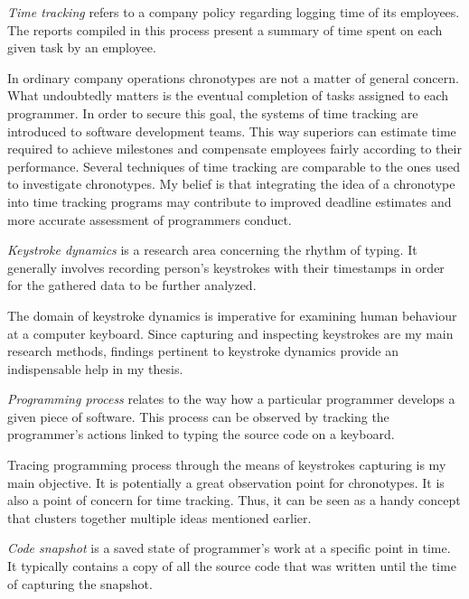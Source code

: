 \begin{definition}
\emph{Time tracking} refers to a company policy regarding logging time of its employees. The reports compiled in this process present a summary of time spent on each given task by an employee. \cite{Fed21TimeTracking}
\end{definition}

In ordinary company operations chronotypes are not a matter of general concern. What undoubtedly matters is the eventual completion of tasks assigned to each programmer. In order to secure this goal, the systems of time tracking are introduced to software development teams. This way superiors can estimate time required to achieve milestones and compensate employees fairly according to their performance. Several techniques of time tracking are comparable to the ones used to investigate chronotypes. My belief is that integrating the idea of a chronotype into time tracking programs may contribute to improved deadline estimates and more accurate assessment of programmers conduct.

\begin{definition}
\emph{Keystroke dynamics} is a research area concerning the rhythm of typing. It generally involves recording person's keystrokes with their timestamps in order for the gathered data to be further analyzed. \cite{Lei19Dissertation}
\end{definition}

The domain of keystroke dynamics is imperative for examining human behaviour at a computer keyboard. Since capturing and inspecting keystrokes are my main research methods, findings pertinent to keystroke dynamics provide an indispensable help in my thesis.

\begin{definition}\label{def:programming_process}
\emph{Programming process} relates to the way how a particular programmer develops a given piece of software. This process can be observed by tracking the programmer's actions linked to typing the source code on a keyboard. \cite{Mat13PPV}
\end{definition}

Tracing programming process through the means of keystrokes capturing is my main objective. It is potentially a great observation point for chronotypes. It is also a point of concern for time tracking. Thus, it can be seen as a handy concept that clusters together multiple ideas mentioned earlier.

\begin{definition}
\emph{Code snapshot} is a saved state of programmer's work at a specific point in time. It typically contains a copy of all the source code that was written until the time of capturing the snapshot. \cite{Jad06NoviceCompilationBehaviour}
\end{definition}

